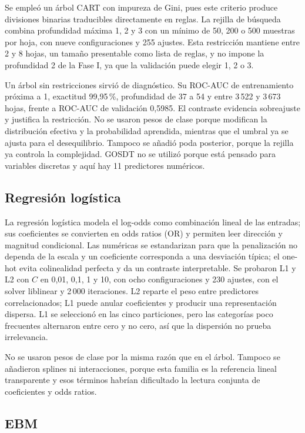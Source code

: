 Se empleó un árbol CART con impureza de Gini, pues este criterio produce divisiones binarias traducibles directamente en reglas. La rejilla de búsqueda combina profundidad máxima 1, 2 y 3 con un mínimo de 50, 200 o 500 muestras por hoja, con nueve configuraciones y 255 ajustes. Esta restricción mantiene entre 2 y 8 hojas, un tamaño presentable como lista de reglas, y no impone la profundidad 2 de la Fase I, ya que la validación puede elegir 1, 2 o 3.

Un árbol sin restricciones sirvió de diagnóstico. Su ROC-AUC de entrenamiento próxima a 1, exactitud 99,95\,\%, profundidad de 37 a 54 y entre 3\,522 y 3\,673 hojas, frente a ROC-AUC de validación 0,5985. El contraste evidencia sobreajuste y justifica la restricción. No se usaron pesos de clase porque modifican la distribución efectiva y la probabilidad aprendida, mientras que el umbral ya se ajusta para el desequilibrio. Tampoco se añadió poda posterior, porque la rejilla ya controla la complejidad. GOSDT no se utilizó porque está pensado para variables discretas y aquí hay 11 predictores numéricos.

\subsection{Regresión logística}

La regresión logística modela el log-odds como combinación lineal de las entradas; sus coeficientes se convierten en odds ratios (OR) y permiten leer dirección y magnitud condicional. Las numéricas se estandarizan para que la penalización no dependa de la escala y un coeficiente corresponda a una desviación típica; el one-hot evita colinealidad perfecta y da un contraste interpretable. Se probaron L1 y L2 con $C$ en 0,01, 0,1, 1 y 10, con ocho configuraciones y 230 ajustes, con el solver liblinear y 2\,000 iteraciones. L2 reparte el peso entre predictores correlacionados; L1 puede anular coeficientes y producir una representación dispersa. L1 se seleccionó en las cinco particiones, pero las categorías poco frecuentes alternaron entre cero y no cero, así que la dispersión no prueba irrelevancia.

No se usaron pesos de clase por la misma razón que en el árbol. Tampoco se añadieron splines ni interacciones, porque esta familia es la referencia lineal transparente y esos términos habrían dificultado la lectura conjunta de coeficientes y odds ratios.

\subsection{EBM}

